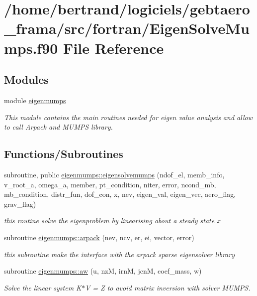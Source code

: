 \hypertarget{_eigen_solve_mumps_8f90}{}\section{/home/bertrand/logiciels/gebtaero\+\_\+frama/src/fortran/\+Eigen\+Solve\+Mumps.f90 File Reference}
\label{_eigen_solve_mumps_8f90}
\subsection*{Modules}
\begin{DoxyCompactItemize}
\item 
module \hyperlink{namespaceeigenmumps}{eigenmumps}
\begin{DoxyCompactList}\small\item\em This module contains the main routines needed for eigen value analysis and allow to call Arpack and M\+U\+M\+PS library. \end{DoxyCompactList}\end{DoxyCompactItemize}
\subsection*{Functions/\+Subroutines}
\begin{DoxyCompactItemize}
\item 
subroutine, public \hyperlink{namespaceeigenmumps_ae4a95ffe93412104411a9914edccd507}{eigenmumps\+::eigensolvemumps} (ndof\+\_\+el, memb\+\_\+info, v\+\_\+root\+\_\+a, omega\+\_\+a, member, pt\+\_\+condition, niter, error, ncond\+\_\+mb, mb\+\_\+condition, distr\+\_\+fun, dof\+\_\+con, x, nev, eigen\+\_\+val, eigen\+\_\+vec, aero\+\_\+flag, grav\+\_\+flag)
\begin{DoxyCompactList}\small\item\em this routine solve the eigenproblem by linearising about a steady state x \end{DoxyCompactList}\item 
subroutine \hyperlink{namespaceeigenmumps_a86ca8fa64997377eaafa9b3b69a86d49}{eigenmumps\+::arpack} (nev, ncv, er, ei, vector, error)
\begin{DoxyCompactList}\small\item\em this subroutine make the interface with the arpack sparse eigensolver library \end{DoxyCompactList}\item 
subroutine \hyperlink{namespaceeigenmumps_ac941735ba53914846bfec44d74ad79c6}{eigenmumps\+::aw} (u, nzM, irnM, jcnM, coef\+\_\+mass, w)
\begin{DoxyCompactList}\small\item\em Solve the linear system K$\ast$V = Z to avoid matrix inversion with solver M\+U\+M\+PS. \end{DoxyCompactList}\end{DoxyCompactItemize}
